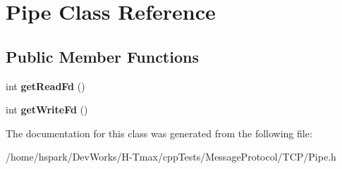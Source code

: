 \hypertarget{classPipe}{\section{Pipe Class Reference}
\label{classPipe}
}
\subsection*{Public Member Functions}
\begin{DoxyCompactItemize}
\item 
\hypertarget{classPipe_abf05b8e0b2df21a45ed48d2aaf80370b}{int {\bfseries get\-Read\-Fd} ()}\label{classPipe_abf05b8e0b2df21a45ed48d2aaf80370b}

\item 
\hypertarget{classPipe_a7bd26dd1f35fc5584199a643b41a4799}{int {\bfseries get\-Write\-Fd} ()}\label{classPipe_a7bd26dd1f35fc5584199a643b41a4799}

\end{DoxyCompactItemize}


The documentation for this class was generated from the following file\-:\begin{DoxyCompactItemize}
\item 
/home/hspark/\-Dev\-Works/\-H-\/\-Tmax/cpp\-Tests/\-Message\-Protocol/\-T\-C\-P/Pipe.\-h\end{DoxyCompactItemize}
